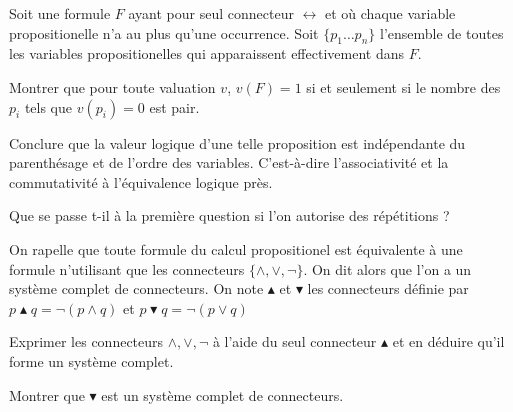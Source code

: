\documentclass[french]{report}
\begin{document}
\begin{exo}
    Soit une formule \(F\) ayant pour seul connecteur \(\leftrightarrow\) et où
    chaque variable propositionelle n'a au plus qu'une occurrence. Soit
    \(\{p_1\dots p_n\}\) l'ensemble de toutes les variables propositionelles qui
    apparaissent effectivement dans \(F\).
    \begin{q}{1}
        Montrer que pour toute valuation \(v\), \(v(F)=1\) si et seulement si
        le nombre des \(p_i\) tels que \(v(p_i)=0\) est pair.
    \end{q}
    \begin{q}{2}
        Conclure que la valeur logique d'une telle proposition est indépendante
        du parenthésage et de l'ordre des variables. C'est-à-dire l'associativité
        et la commutativité à l'équivalence logique près.
    \end{q}
    \begin{q}{3}
        Que se passe t-il à la première question si l'on autorise des répétitions ?
    \end{q}
\end{exo}

\begin{exo}
    On rapelle que toute formule du calcul propositionel est équivalente à une formule
    n'utilisant que les connecteurs \(\{\land,\lor,\lnot\}\). On dit alors que l'on a
    un système complet de connecteurs. On note \(\blacktriangle\) et \(\blacktriangledown\)
    les connecteurs définie par \(p\blacktriangle q=\lnot(p\land q)\) et
    \(p\blacktriangledown q=\lnot(p\lor q)\)
    \begin{q}{1}
        Exprimer les connecteurs \(\land, \lor, \lnot\) à l'aide du seul connecteur
        \(\blacktriangle\) et en déduire qu'il forme un système complet.
    \end{q}
    \begin{q}{2}
        Montrer que \(\blacktriangledown\) est un système complet de connecteurs.
    \end{q}
\end{exo}
\end{document}
